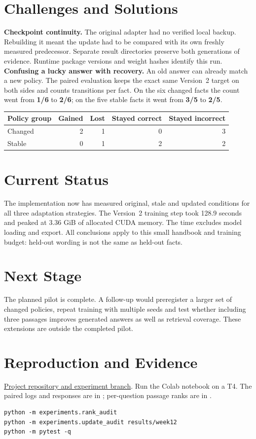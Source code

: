 \documentclass[10pt,letterpaper]{article}
\begin{document}
\section{Challenges and Solutions}
\textbf{Checkpoint continuity.} The original adapter had no verified local backup. Rebuilding it meant the update had to be compared with its own freshly measured predecessor. Separate result directories preserve both generations of evidence. Runtime package versions and weight hashes identify this run.
\textbf{Confusing a lucky answer with recovery.} An old answer can already match a new policy. The paired evaluation keeps the exact same Version~2 target on both sides and counts transitions per fact. On the six changed facts the count went from \textbf{1/6} to \textbf{2/6}; on the five stable facts it went from \textbf{3/5} to \textbf{2/5}.
\begin{center}
\begin{tabular}{lrrrr}\toprule
Policy group & Gained & Lost & Stayed correct & Stayed incorrect\\\midrule
Changed & 2 & 1 & 0 & 3\\
Stable & 0 & 1 & 2 & 2\\\bottomrule
\end{tabular}
\end{center}
\section{Current Status}
The implementation now has measured original, stale and updated conditions for all three adaptation strategies. The Version~2 training step took 128.9 seconds and peaked at 3.36 GiB of allocated CUDA memory. The time excludes model loading and export. All conclusions apply to this small handbook and training budget: held-out wording is not the same as held-out facts.
\section{Next Stage}
The planned pilot is complete. A follow-up would preregister a larger set of changed policies, repeat training with multiple seeds and test whether including three passages improves generated answers as well as retrieval coverage. These extensions are outside the completed pilot.
\clearpage\appendix
\section{Reproduction and Evidence}
\href{https://github.com/Somama12/llm-adaptation-comparison/tree/codex/midterm-experiments}{Project repository and experiment branch}. Run the Colab notebook on a T4. The paired logs and responses are in ; per-question passage ranks are in .
\begin{verbatim}
python -m experiments.rank_audit
python -m experiments.update_audit results/week12
python -m pytest -q
\end{verbatim}
\end{document}
